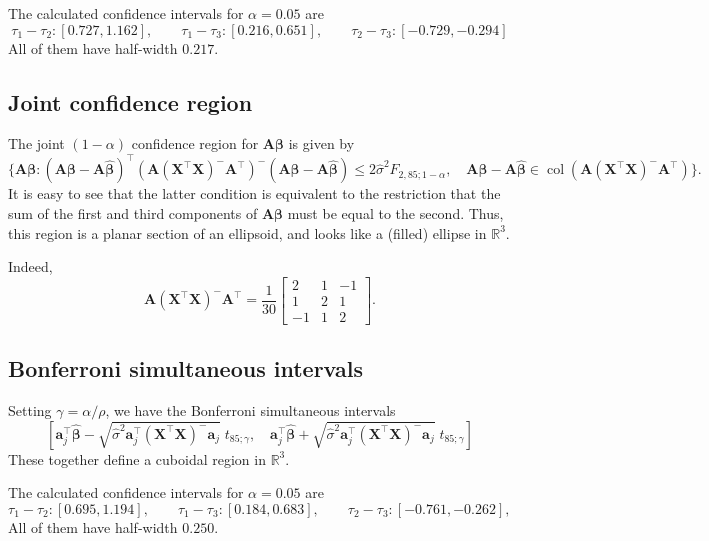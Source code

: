 \documentclass[10pt]{article}
\renewcommand{\vec}{\bm}
\DeclareMathOperator{\col}{col}
\newcommand{\R}{\mathbb{R}}
\begin{document}
    The calculated confidence intervals for $\alpha = 0.05$ are \[
        \tau_1 - \tau_2 : [0.727, 1.162], \qquad
        \tau_1 - \tau_3 : [0.216, 0.651], \qquad
        \tau_2 - \tau_3 : [-0.729, -0.294]
    \] All of them have half-width $0.217$.


    \subsection{Joint confidence region}

    The joint $(1 - \alpha)$ confidence region for $\vec{A}\vec{\beta}$ is given by
    \[
        \{\vec{A}\vec{\beta}\colon (\vec{A}\vec{\beta} -
        \vec{A}\hat{\vec{\beta}})^\top (\vec{A}(\vec{X}^\top\vec{X})^-\vec{A}^\top)^-
        (\vec{A}\vec{\beta} - \vec{A}\hat{\vec{\beta}}) \leq 2\hat{\sigma}^2 F_{2,
        85; 1 - \alpha}, \quad
            \vec{A}\vec{\beta} - \vec{A}\hat{\vec{\beta}} \in
            \col(\vec{A}(\vec{X}^\top\vec{X})^-\vec{A}^\top)
        \}.
    \] It is easy to see that the latter condition is equivalent to the restriction
    that the sum of the first and third components of $\vec{A}\vec{\beta}$ must be
    equal to the second. Thus, this region is a planar section of an ellipsoid, and
    looks like a (filled) ellipse in $\R^3$.

    Indeed, \[
        \vec{A}(\vec{X}^\top\vec{X})^-\vec{A}^\top = \frac{1}{30} \begin{bmatrix}
            2 & 1 & -1 \\
            1 & 2 & 1 \\
            -1 & 1 & 2
        \end{bmatrix}.
    \] 

    \subsection{Bonferroni simultaneous intervals}

    Setting $\gamma = \alpha / \rho$, we have the Bonferroni simultaneous intervals
    \[
        \left[
        \vec{a}_j^\top\hat{\vec{\beta}} - \sqrt{\hat{\sigma}^2
        \vec{a}_j^\top(\vec{X}^\top \vec{X})^-\vec{a}_j}\; t_{85; \gamma}, \quad
        \vec{a}_j^\top\hat{\vec{\beta}} + \sqrt{\hat{\sigma}^2
        \vec{a}_j^\top(\vec{X}^\top \vec{X})^-\vec{a}_j}\; t_{85; \gamma}
        \right]
    \] These together define a cuboidal region in $\R^3$.

    The calculated confidence intervals for $\alpha = 0.05$ are \[
        \tau_1 - \tau_2 : [0.695, 1.194], \qquad
        \tau_1 - \tau_3 : [0.184, 0.683], \qquad
        \tau_2 - \tau_3 : [-0.761, -0.262], \qquad
    \] All of them have half-width $0.250$.
\end{document}
